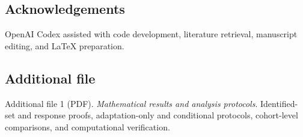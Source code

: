 \documentclass[pdflatex,sn-vancouver-num,iicol]{sn-jnl}
\begin{document}
\subsection*{Acknowledgements}
OpenAI Codex assisted with code development, literature retrieval, manuscript
editing, and \LaTeX{} preparation.

\subsection*{Additional file}
Additional file 1 (PDF). \emph{Mathematical results and analysis protocols}.
Identified-set and response proofs, adaptation-only and conditional protocols,
cohort-level comparisons, and computational verification.

\ifdefined\ReaderVersion\else
  \setlength{\bibsep}{3pt}
\fi
\begingroup
\ifdefined\ReaderVersion\balance\fi
\renewcommand{\bibfont}{\normalfont\small}
\raggedright
{}

\endgroup
\end{document}
